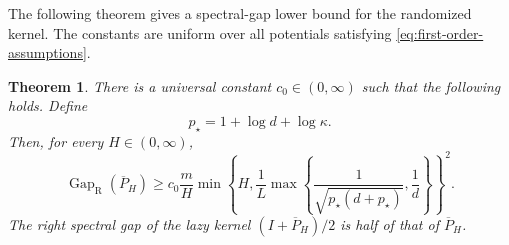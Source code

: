 \documentclass[11pt]{article}
\newtheorem{theorem}{Theorem}[section]
\newtheorem{lemma}[lemma]{Lemma}
\newcommand{\Gap}{\operatorname{Gap}_{\mathrm{R}}}
\newcommand{\cE}{\mathcal E}
\newcommand{\1}{\mathbf 1}
\newcommand{\df}{\mathrm{d}}
\begin{document}
	
	
	The following theorem gives a spectral-gap lower bound for the randomized kernel.
	The constants are uniform over all potentials satisfying
	\eqref{eq:first-order-assumptions}. 
	
	\begin{theorem} \label{thm:main}
		There is a universal constant $c_0\in(0,\infty)$ such that the following holds.  Define
		\begin{equation*}
			p_\star=1+\log d+\log\kappa.
		\end{equation*}
		Then, for every \(H \in (0,\infty)\),
		\begin{equation}\label{eq:master-gap}
			\Gap(\overline P_H)
			\geq
			c_0\frac{m}{H}
			\min\left\{
			H,
			\frac1L
			\max\left\{
			\frac{1}{\sqrt{p_\star(d+p_\star)}},
			\frac1d
			\right\}
			\right\}^{2}.
		\end{equation}
		The right spectral gap of the lazy kernel $(I+\overline P_H)/2$ is half of that of $\overline P_H$.
	\end{theorem}
	
\end{document}
